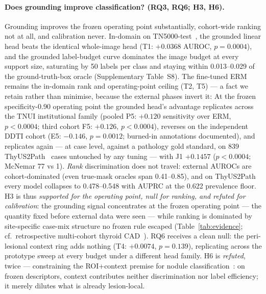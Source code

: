 \documentclass[jimh,article,submit,moreauthors,pdftex]{Definitions/tsp}
\begin{document}
\paragraph{Does grounding improve classification? (RQ3, RQ6; H3, H6).}
Grounding improves the frozen operating point substantially, cohort-wide
ranking not at all, and calibration never. In-domain on
TN5000-test~\cite{rev_zhang2025tn5000}, the grounded linear head beats the
identical whole-image head (T1: $+0.0368$ AUROC, $p{=}0.0004$), and the
grounded label-budget curve dominates the image budget at every support
size, saturating by 50 labels per class and staying within 0.013--0.029 of
the ground-truth-box oracle (Supplementary Table~S8). The fine-tuned ERM
remains the in-domain rank and operating-point ceiling (T2, T5) --- a fact
we retain rather than minimise, because the external phases invert it: At the frozen specificity-0.90 operating point the
grounded head's advantage replicates across the TNUI institutional family
(pooled P5: $+0.120$ sensitivity over ERM, $p{<}0.0004$; third cohort F5:
$+0.126$, $p{<}0.0004$), reverses on the independent DDTI cohort (E5:
$-0.146$, $p{=}0.0012$; burned-in annotations documented), and replicates
again --- at case level, against a pathology gold standard, on 839
ThyUS2Path~\cite{rev_hou2024thyus2path} cases untouched by any tuning ---
with J1 $+0.1457$ ($p{<}0.0004$; McNemar 77 vs 1). \emph{Rank}
discrimination does not travel: external AUROCs are cohort-dominated (even
true-mask oracles span 0.41--0.85), and on ThyUS2Path every model
collapses to 0.478--0.548 with AUPRC at the 0.622 prevalence floor. H3 is
thus \emph{supported for the operating point, null for ranking, and
refuted for calibration}: the grounding signal concentrates at the frozen
operating point --- the quantity fixed before external data were seen ---
while ranking is dominated by site-specific case-mix structure no frozen
rule escaped (Table~\ref{tab:evidence}; cf.~retrospective multi-cohort
thyroid CAD~\cite{rev_li2019multicohort}). RQ6 receives a clean null: the
peri-lesional context ring adds nothing (T4: $+0.0074$, $p{=}0.139$),
replicating across the prototype sweep at every budget under a different
head family. H6 is \emph{refuted}, twice --- constraining the ROI+context
premise for nodule classification~\cite{rev_yavuz2026roicontext}: on
frozen descriptors, context contributes neither discrimination nor label
efficiency; it merely dilutes what is already lesion-local.
\end{document}
